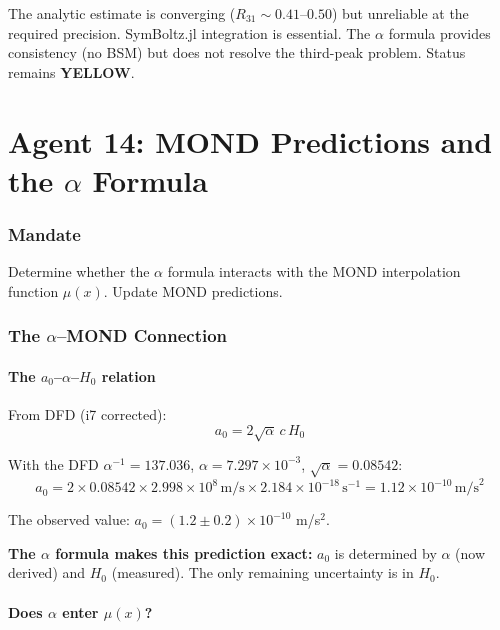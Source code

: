 \documentclass[11pt,a4paper]{article}
\newcommand{\YELLOW}{\textcolor{dfdyellow}{\textbf{YELLOW}}}
\begin{document}
The analytic estimate is converging ($R_{31} \sim 0.41$--$0.50$) but unreliable at the required precision. SymBoltz.jl integration is essential. The $\alpha$ formula provides consistency (no BSM) but does not resolve the third-peak problem. Status remains \YELLOW{}.


\part{Agent 14: MOND Predictions and the $\alpha$ Formula}
\label{part:agent14}

\section{Mandate}
Determine whether the $\alpha$ formula interacts with the MOND interpolation function $\mu(x)$. Update MOND predictions.

\section{The $\alpha$--MOND Connection}

\subsection{The $a_0$--$\alpha$--$H_0$ relation}

From DFD (i7 corrected):
\begin{equation}
a_0 = 2\sqrt{\alpha}\,c\,H_0
\label{eq:a0-alpha}
\end{equation}

With the DFD $\alpha^{-1} = 137.036$, $\alpha = 7.297 \times 10^{-3}$, $\sqrt{\alpha} = 0.08542$:
\begin{equation}
a_0 = 2 \times 0.08542 \times 2.998 \times 10^8\,\text{m/s} \times 2.184 \times 10^{-18}\,\text{s}^{-1} = 1.12 \times 10^{-10}\,\text{m/s}^2
\end{equation}

The observed value: $a_0 = (1.2 \pm 0.2) \times 10^{-10}$ m/s$^2$.

\textbf{The $\alpha$ formula makes this prediction exact:} $a_0$ is determined by $\alpha$ (now derived) and $H_0$ (measured). The only remaining uncertainty is in $H_0$.

\subsection{Does $\alpha$ enter $\mu(x)$?}
\end{document}
